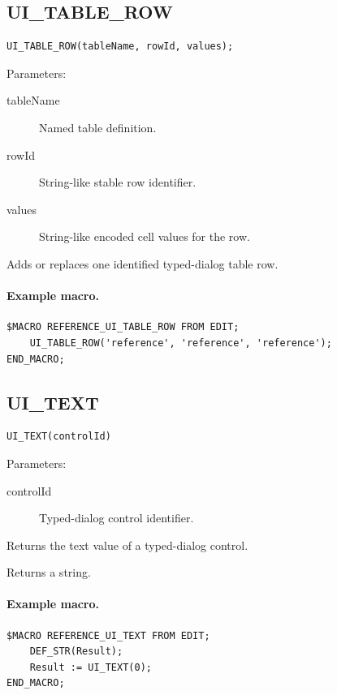 \documentclass[a4paper,10pt,twoside,openany]{book}
\newenvironment{mrmacextension}{\begin{changebar}}{\end{changebar}}
\begin{document}
\begin{mrmacextension}
\label{prim:procedure-ui-table-row}
\subsection*{UI\_TABLE\_ROW}
\begin{verbatim}
UI_TABLE_ROW(tableName, rowId, values);
\end{verbatim}
Parameters:
\begin{description}
\item[tableName] Named table definition.
\item[rowId] String-like stable row identifier.
\item[values] String-like encoded cell values for the row.
\end{description}

Adds or replaces one identified typed-dialog table row.

\paragraph{Example macro.}
\begin{verbatim}
$MACRO REFERENCE_UI_TABLE_ROW FROM EDIT;
    UI_TABLE_ROW('reference', 'reference', 'reference');
END_MACRO;
\end{verbatim}
\end{mrmacextension}

\begin{mrmacextension}
\label{prim:intrinsic-ui-text}
\subsection*{UI\_TEXT}
\begin{verbatim}
UI_TEXT(controlId)
\end{verbatim}
Parameters:
\begin{description}
\item[controlId] Typed-dialog control identifier.
\end{description}

Returns the text value of a typed-dialog control.

Returns a string.

\paragraph{Example macro.}
\begin{verbatim}
$MACRO REFERENCE_UI_TEXT FROM EDIT;
    DEF_STR(Result);
    Result := UI_TEXT(0);
END_MACRO;
\end{verbatim}
\end{mrmacextension}
\end{document}

